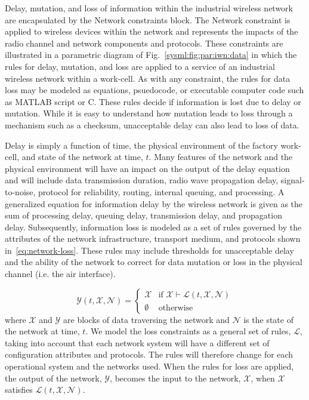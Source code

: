 Delay, mutation, and loss of information within the industrial wireless network are encapsulated by the Network constraints block.  The Network constraint is applied to wireless devices within the network and represents the impacts of the radio channel and network components and protocols.  These constraints are illustrated in a parametric diagram of Fig.~\ref{sysml:fig:par:iwn:data} in which the rules for delay, mutation, and loss are applied to a service of an industrial wireless network within a work-cell. As with any constraint, the rules for data loss may be modeled as equations, psuedocode, or executable computer code such as MATLAB script or C.  These rules decide if information is lost due to delay or mutation.  While it is easy to understand how mutation leads to loss through a mechanism such as a checksum, unacceptable delay can also lead to loss of data.  

Delay is simply a function of time, the physical environment of the factory work-cell, and state of the network at time, $t$. Many features of the network and the physical environment will have an impact on the output of the delay equation and will include data transmission duration, radio wave propagation delay, signal-to-noise, protocol for reliability, routing, internal queuing, and processing. A generalized equation for information delay by the wireless network is given as the sum of processing delay, queuing delay, transmission delay, and propagation delay. Subsequently, information loss is modeled as a set of rules governed by the attributes of the network infrastructure, transport medium, and protocols shown in~\eqref{eq:network-loss}. These rules may include thresholds for unacceptable delay and the ability of the network to correct for data mutation or loss in the physical channel (i.e. the air interface).

\begin{equation}\label{eq:network-loss}
\mathcal{Y}(t,\mathcal{X},\mathcal{N}) = 
\begin{cases} 
\mathcal{X} & \text{if } \mathcal{X} \vdash \mathcal{L}(t,\mathcal{X},\mathcal{N}) \\
\emptyset   & \text{otherwise}
\end{cases}
\end{equation}
where $\mathcal{X}$ and $\mathcal{Y}$ are blocks of data traversing the network and $\mathcal{N}$ is the state of the network at time, $t$.	We model the loss constraints as a general set of rules, $\mathcal{L}$, taking into account that each network system will have a different set of configuration attributes and protocols.  The rules will therefore change for each operational system and the networks used.  When the rules for loss are applied, the output of the network, $\mathcal{Y}$, becomes the input to the network, $\mathcal{X}$, when $\mathcal{X}$ satisfies $\mathcal{L}(t,\mathcal{X},\mathcal{N})$.

